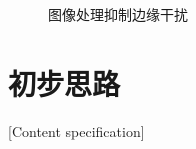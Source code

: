 \documentclass[fontset=fandol,type=bachelor,campus=harbin]{hithesisbook}
\begin{document}
\begin{figure}[h]
{		\label{图像处理抑制边缘干扰c}
	}
	\caption{图像处理抑制边缘干扰}
	\label{图像处理抑制边缘干扰}
\end{figure}



\section{初步思路}[Content specification]
\end{document}
